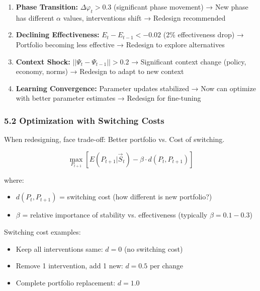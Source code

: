 \begin{enumerate}
\item \textbf{Phase Transition:} $\Delta \varphi_t > 0.3$ (significant phase movement)
   → New phase has different $\alpha$ values, interventions shift
   → Redesign recommended

\item \textbf{Declining Effectiveness:} $E_t - E_{t-1} < -0.02$ (2\% effectiveness drop)
   → Portfolio becoming less effective
   → Redesign to explore alternatives

\item \textbf{Context Shock:} $||\Psi_t - \Psi_{t-1}|| > 0.2$
   → Significant context change (policy, economy, norms)
   → Redesign to adapt to new context

\item \textbf{Learning Convergence:} Parameter updates stabilized
   → Now can optimize with better parameter estimates
   → Redesign for fine-tuning
\end{enumerate}

\subsubsection*{5.2 Optimization with Switching Costs}

When redesigning, face trade-off: Better portfolio vs. Cost of switching.

\begin{equation}
\max_{P_{t+1}} \left[ E(P_{t+1} | \vec{S}_t) - \beta \cdot d(P_t, P_{t+1}) \right]
\label{eq:kkk-redesign-optimization}
\end{equation}

where:
\begin{itemize}[nosep]
\item $d(P_t, P_{t+1})$ = switching cost (how different is new portfolio?)
\item $\beta$ = relative importance of stability vs. effectiveness (typically $\beta = 0.1-0.3$)
\end{itemize}

Switching cost examples:
\begin{itemize}[nosep]
\item Keep all interventions same: $d = 0$ (no switching cost)
\item Remove 1 intervention, add 1 new: $d = 0.5$ per change
\item Complete portfolio replacement: $d = 1.0$
\end{itemize}

